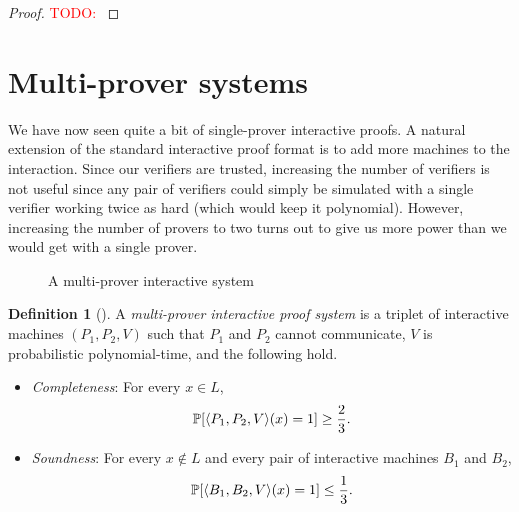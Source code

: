 \documentclass[english,12pt]{reedthesis}
\theoremstyle{plain}
\theoremstyle{definition}
\newtheorem{defn}[defn]{Definition}
\theoremstyle{remark}
\DeclarePairedDelimiter{\ang}{\langle}{\rangle}
\newcommand{\TODO}[1]{\textcolor{red}{TODO: #1}}
\begin{document}
\begin{proof}
  \TODO{}
\end{proof}

\section{Multi-prover systems}\label{sec:multi-prover}

We have now seen quite a bit of single-prover interactive proofs. A natural
extension of the standard interactive proof format is to add more machines to
the interaction. Since our verifiers are trusted, increasing the number of
verifiers is not useful since any pair of verifiers could simply be simulated
with a single verifier working twice as hard (which would keep it polynomial).
However, increasing the number of provers to two turns out to give us more power
than we would get with a single prover.

\begin{figure}[htbp]
  \centering
  \caption{A multi-prover interactive system}\label{fig:mip}
\end{figure}

\begin{defn}[{\cite[Def.\ 4.11.2]{Go01}}]\label{def:mps}
  A \emph{multi-prover interactive proof system} is a triplet of interactive
  machines $(P_{1}, P_{2}, V)$ such that $P_{1}$ and $P_{2}$ cannot communicate,
  $V$ is probabilistic polynomial-time, and the following hold.
  \begin{itemize}
    \item \emph{Completeness}: For every $x \in L$,
          \[
            \mathbb{P}[\ang{P_{1}, P_{2}, V}(x) = 1] \ge \frac{2}{3}.
          \]
    \item \emph{Soundness}: For every $x \notin L$ and every pair of interactive
          machines $B_{1}$ and $B_{2}$,
          \[
            \mathbb{P}[\ang{B_{1}, B_{2}, V}(x) = 1] \le \frac{1}{3}.
          \]
  \end{itemize}
\end{defn}
\end{document}
